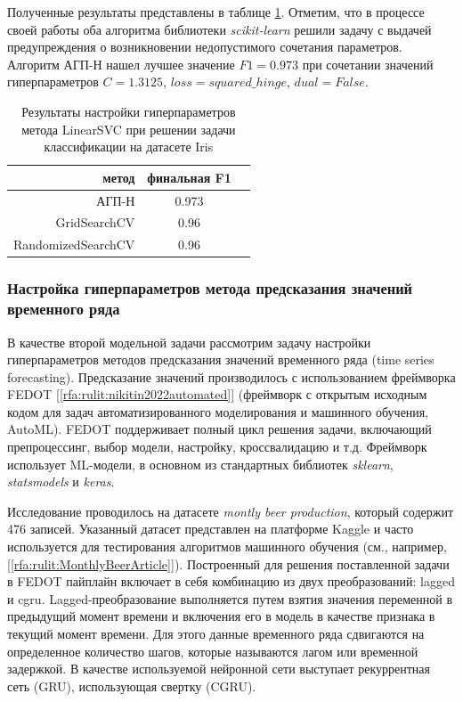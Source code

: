 \documentclass[a4paper,12pt,russian]{article}
\begin{document}
Полученные результаты представлены в таблице \ref{tab22}. Отметим, что в процессе своей работы оба алгоритма библиотеки \textit{scikit-learn} решили задачу с выдачей предупреждения о возникновении недопустимого сочетания параметров. Алгоритм АГП-Н нашел лучшее значение $F1 = 0.973$ при сочетании значений гиперпараметров $C=1.3125$, $loss=squared\_hinge$, $dual = False$.

\begin{table}[h!]
\centering
\caption{Результаты настройки гиперпараметров метода LinearSVC при решении задачи классификации на датасете Iris}\label{tab22}
\begin{tabular}{|r|c|c|}
\hline
метод & финальная F1 \\
\hline \hline
АГП-Н & 0.973 \\
\hline
GridSearchCV & 0.96 \\
\hline
RandomizedSearchCV & 0.96 \\
\hline
\end{tabular}
\end{table}


\subsubsection{Настройка гиперпараметров метода предсказания значений временного ряда }

В качестве второй модельной задачи рассмотрим задачу настройки гиперпараметров методов предсказания значений временного ряда (time series forecasting). Предсказание значений производилось с использованием фреймворка FEDOT [\ref{rfa:rulit:nikitin2022automated}]
(фреймворк с открытым исходным кодом для задач автоматизированного моделирования и машинного обучения, AutoML). FEDOT поддерживает полный цикл решения задачи, включающий препроцессинг, выбор модели, настройку, кроссвалидацию и т.д. Фреймворк использует ML-модели, в основном из стандартных библиотек \textit{sklearn}, \textit{statsmodels} и \textit{keras}.

Исследование проводилось на датасете \textit{montly beer production}, который содержит 476 записей. %
Указанный датасет представлен на платформе Kaggle и часто используется для тестирования алгоритмов машинного обучения (см., например, [\ref{rfa:rulit:MonthlyBeerArticle}]).
Построенный для решения поставленной задачи в FEDOT пайплайн включает в себя комбинацию из двух преобразований: lagged и cgru. Lagged-преобразование выполняется путем взятия значения переменной в предыдущий момент времени и включения его в модель в качестве признака в текущий момент времени. Для этого данные временного ряда сдвигаются на определенное количество шагов, которые называются лагом или временной задержкой. В качестве используемой нейронной сети выступает рекуррентная сеть (GRU), использующая свертку (CGRU).
\end{document}
